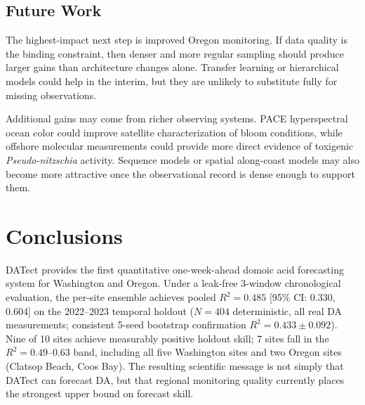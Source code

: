\documentclass[toxins,article,submit,moreauthors]{Definitions/mdpi}
\begin{document}
\subsection{Future Work}
\label{sec:discussion-future}

The highest-impact next step is improved Oregon monitoring. If data quality is the binding constraint, then denser and more regular sampling should produce larger gains than architecture changes alone. Transfer learning or hierarchical models could help in the interim, but they are unlikely to substitute fully for missing observations.

Additional gains may come from richer observing systems. PACE hyperspectral ocean color \cite{Werdell2019} could improve satellite characterization of bloom conditions, while offshore molecular measurements \cite{Brunson2024} could provide more direct evidence of toxigenic \textit{Pseudo-nitzschia} activity. Sequence models or spatial along-coast models may also become more attractive once the observational record is dense enough to support them.


\section{Conclusions}
\label{sec:conclusions}

DATect provides the first quantitative one-week-ahead domoic acid forecasting system for Washington and Oregon. Under a leak-free 3-window chronological evaluation, the per-site ensemble achieves pooled $R^2 = 0.485$ [95\% CI: 0.330, 0.604] on the 2022--2023 temporal holdout ($N = 404$ deterministic, all real DA measurements; consistent 5-seed bootstrap confirmation $R^2 = 0.433 \pm 0.092$). Nine of 10 sites achieve measurably positive holdout skill; 7 sites fall in the $R^2 = 0.49$--$0.63$ band, including all five Washington sites and two Oregon sites (Clatsop Beach, Coos Bay). The resulting scientific message is not simply that DATect can forecast DA, but that regional monitoring quality currently places the strongest upper bound on forecast skill.
\end{document}
